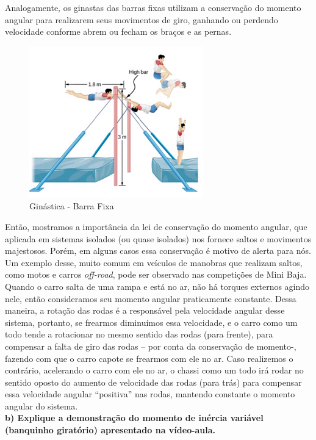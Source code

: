 Analogamente, os ginastas das barras fixas utilizam a conservação do momento angular para realizarem seus movimentos de giro, ganhando ou perdendo velocidade conforme abrem ou fecham os braços e as pernas. \\

\begin{figure}[H]
  \centering
  \includegraphics[scale=1.5]{images/i3.png}
  \caption{Ginástica - Barra Fixa }
\end{figure}

Então, mostramos a importância da lei de conservação do momento angular, que aplicada em sistemas isolados (ou quase isolados) nos fornece saltos e movimentos majestosos. Porém, em alguns casos essa conservação é motivo de alerta para nós.\\

Um exemplo desse, muito comum em veículos de manobras que realizam saltos, como motos e carros \textit{off-road}, pode ser observado nas competições de Mini Baja. Quando o carro salta de uma rampa e está no ar, não há torques externos agindo nele, então consideramos seu momento angular praticamente constante. Dessa maneira, a rotação das rodas é a responsável pela velocidade angular desse sistema, portanto, se frearmos diminuímos essa velocidade, e o carro como um todo tende a rotacionar no mesmo sentido das rodas (para frente), para compensar a falta de giro das rodas – por conta da conservação de momento-, fazendo com que o carro capote se frearmos com ele no ar. 
Caso realizemos o contrário, acelerando o carro com ele no ar, o chassi como um todo irá rodar no sentido oposto do aumento de velocidade das rodas (para trás) para compensar essa velocidade angular “positiva” nas rodas, mantendo constante o momento angular do sistema.\\ 

\textbf{b) Explique a demonstração do momento de inércia variável (banquinho giratório) apresentado na vídeo-aula.}\\

